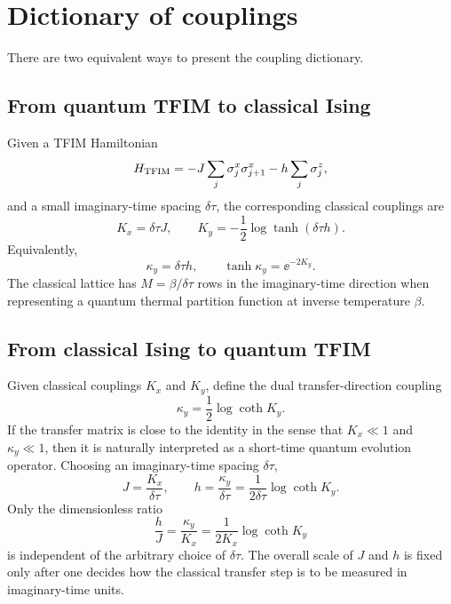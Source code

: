 \section{Dictionary of couplings}
\label{sec:ising-tfim-coupling-dictionary}

There are two equivalent ways to present the coupling dictionary.

\subsection{From quantum TFIM to classical Ising}
\label{subsec:ising-tfim-quantum-to-classical}

Given a TFIM Hamiltonian
\begin{equation}
    H_{\rm TFIM}
    =
    -J\sum_j\sigma_j^x\sigma_{j+1}^x
    -h\sum_j\sigma_j^z,
\end{equation}
and a small imaginary-time spacing $\delta\tau$, the corresponding classical
couplings are
\begin{equation}
\label{eq:ising-tfim-quantum-to-classical-dictionary}
    \boxed{
    K_x=\delta\tau J,
    \qquad
    K_y=-\frac12\log\tanh(\delta\tau h)
    }.
\end{equation}
Equivalently,
\begin{equation}
\label{eq:ising-tfim-quantum-to-classical-kappa}
    \kappa_y=\delta\tau h,
    \qquad
    \tanh\kappa_y=\ee^{-2K_y} .
\end{equation}
The classical lattice has $M=\beta/\delta\tau$ rows in the imaginary-time
direction when representing a quantum thermal partition function at inverse
temperature $\beta$.

\subsection{From classical Ising to quantum TFIM}
\label{subsec:ising-tfim-classical-to-quantum}

Given classical couplings $K_x$ and $K_y$, define the dual transfer-direction
coupling
\begin{equation}
\label{eq:ising-tfim-classical-to-quantum-kappa}
    \kappa_y
    =
    \frac12\log\coth K_y .
\end{equation}
If the transfer matrix is close to the identity in the sense that
$K_x\ll1$ and $\kappa_y\ll1$, then it is naturally interpreted as a short-time
quantum evolution operator.  Choosing an imaginary-time spacing $\delta\tau$,
\begin{equation}
\label{eq:ising-tfim-classical-to-quantum-dictionary}
    \boxed{
    J=\frac{K_x}{\delta\tau},
    \qquad
    h=\frac{\kappa_y}{\delta\tau}
    =
    \frac{1}{2\delta\tau}\log\coth K_y
    }.
\end{equation}
Only the dimensionless ratio
\begin{equation}
\label{eq:ising-tfim-ratio-dictionary}
    \boxed{
    \frac{h}{J}
    =
    \frac{\kappa_y}{K_x}
    =
    \frac{1}{2K_x}\log\coth K_y
    }
\end{equation}
is independent of the arbitrary choice of $\delta\tau$.  The overall scale of
$J$ and $h$ is fixed only after one decides how the classical transfer step is to
be measured in imaginary-time units.


